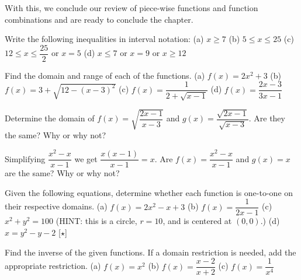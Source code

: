 \documentclass[../book.tex]{subfiles}
\begin{document}
With this, we conclude our review of piece-wise functions and function combinations and are ready to conclude the chapter.
\begin{reviewset}
\item Write the following inequalities in interval notation: \newline 
(a) $x\geq 7$ \hspace{60mm} (b) $5\leq x\leq 25$ \newline 
(c) $12\leq x\leq \dfrac{25}{2}$ or $x=5$ \hspace{34mm} (d) $x\leq 7$ or $x=9$ or $x\geq 12$

\item Find the domain and range of each of the functions.  \newline
(a) $f(x)=2x^2+3$ \hspace{44mm} (b) $f(x)=3+\sqrt{12-(x-3)^2}$ \newline 
(c) $f(x)=\dfrac{1}{2+\sqrt{x-1}}$ \hspace{37mm} (d) $f(x)=\dfrac{2x-3}{3x-1}$

\item Determine the domain of $f(x)=\sqrt{\dfrac{2x-1}{x-3}}$ and $g(x)=\dfrac{\sqrt{2x-1}}{\sqrt{x-3}}$.  Are they the same?  Why or why not?\vspace{2mm}

\item Simplifying $\dfrac{x^2-x}{x-1}$ we get $\dfrac{x(x-1)}{x-1}=x$.  Are $f(x)=\dfrac{x^2-x}{x-1}$ and $g(x)=x$ are the same?  Why or why not?\vspace{2mm}

\item Given the following equations, determine whether each function is one-to-one on their respective domains.  \newline
(a) $f(x)=2x^2-x+3$ \hspace{37mm} (b) $f(x)=\dfrac{1}{2x-1}$ \newline
(c) $x^2+y^2=100$ (HINT: this is a circle, $r=10$, and is centered at $(0,0)$.) \newline
(d) $x=y^2-y-2$ [$\star$]\vspace{2mm}

\item Find the inverse of the given functions.  If a domain restriction is needed, add the appropriate restriction.  \newline 
(a) $f(x)=x^2$ \hspace{25mm} (b) $f(x)=\dfrac{x-2}{x+2}$ \hspace{25mm} (c) $f(x)=\dfrac{1}{x^4}$\vspace{2mm}


\end{reviewset}
\end{document}
